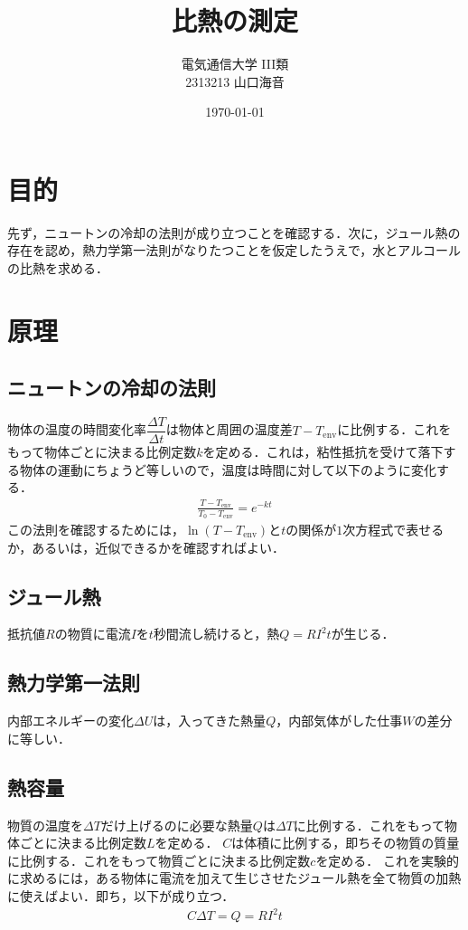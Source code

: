 \documentclass[uplatex,dvipdfmx,a4paper,10pt]{jsarticle}
\title{比熱の測定}
\author{電気通信大学 I\hspace{-1.2pt}I\hspace{-1.2pt}I類\\
2313213 山口海音}
\date{\today}
\begin{document}
\maketitle

\section{目的}
先ず，ニュートンの冷却の法則が成り立つことを確認する．次に，ジュール熱の存在を認め，熱力学第一法則がなりたつことを仮定したうえで，水とアルコールの比熱を求める．

\section{原理}

\subsection{ニュートンの冷却の法則}
物体の温度の時間変化率$\dfrac{\Delta T}{\Delta t}$は物体と周囲の温度差$T-T_{\mathrm{env}}$に比例する．これをもって物体ごとに決まる比例定数$k$を定める．これは，粘性抵抗を受けて落下する物体の運動にちょうど等しいので，温度は時間に対して以下のように変化する．
\begin{align}
    \frac{T-T_\mathrm{env}}{T_0-T_\mathrm{env}}=e^{-kt}
\end{align}
この法則を確認するためには，$\ln(T-T_\mathrm{env})$と$t$の関係が$1$次方程式で表せるか，あるいは，近似できるかを確認すればよい．

\subsection{ジュール熱}
抵抗値$R$の物質に電流$I$を$t$秒間流し続けると，熱$Q=RI^2t$が生じる．

\subsection{熱力学第一法則}
内部エネルギーの変化$\Delta U$は，入ってきた熱量$Q$，内部気体がした仕事$W$の差分に等しい．

\subsection{熱容量}
物質の温度を$\Delta T$だけ上げるのに必要な熱量$Q$は$\Delta T$に比例する．これをもって物体ごとに決まる比例定数$L$を定める．
$C$は体積に比例する，即ちその物質の質量に比例する．これをもって物質ごとに決まる比例定数$c$を定める．
これを実験的に求めるには，ある物体に電流を加えて生じさせたジュール熱を全て物質の加熱に使えばよい．即ち，以下が成り立つ．
\begin{align}
    C\Delta T = Q = RI^2t
\end{align}
\end{document}
